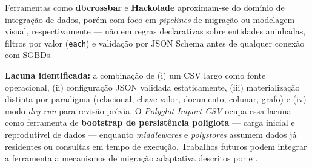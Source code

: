 Ferramentas como \textbf{dbcrossbar} \cite{dbcrossbar2024} e \textbf{Hackolade}
\cite{hackolade2024polyglot} aproximam-se do domínio de integração de dados, porém com
foco em \textit{pipelines} de migração ou modelagem visual, respectivamente --- não em
regras declarativas sobre entidades aninhadas, filtros por valor (\texttt{each}) e
validação por JSON Schema antes de qualquer conexão com SGBDs.

\textbf{Lacuna identificada:} a combinação de (i) um CSV largo como fonte operacional,
(ii) configuração JSON validada estaticamente, (iii) materialização distinta por paradigma
(relacional, chave-valor, documento, colunar, grafo) e (iv) modo \textit{dry-run} para
revisão prévia. O \textit{Polyglot Import CSV} ocupa essa lacuna como ferramenta de
\textbf{bootstrap de persistência poliglota} --- carga inicial e reprodutível de dados ---
enquanto \textit{middlewares} e \textit{polystores} assumem dados já residentes ou
consultas em tempo de execução. Trabalhos futuros podem integrar a ferramenta a mecanismos
de migração adaptativa descritos por  e
.
